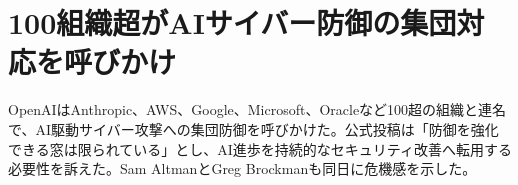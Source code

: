 \section{100組織超がAIサイバー防御の集団対応を呼びかけ}
OpenAIはAnthropic、AWS、Google、Microsoft、Oracleなど100超の組織と連名で、AI駆動サイバー攻撃への集団防御を呼びかけた。公式投稿は「防御を強化できる窓は限られている」とし、AI進歩を持続的なセキュリティ改善へ転用する必要性を訴えた。Sam AltmanとGreg Brockmanも同日に危機感を示した。
